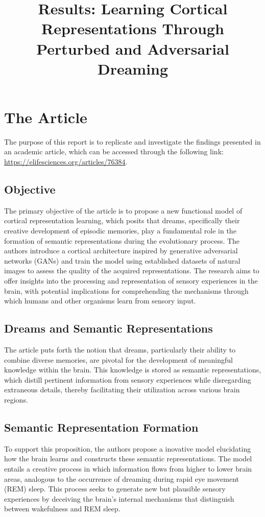\documentclass{midl} %
\title[Results: Learning Cortical Representations Through Perturbed and Adversarial Dreaming]{Results: Learning Cortical Representations Through Perturbed and Adversarial Dreaming}
\begin{document}
\maketitle


\section{The Article}
The purpose of this report is to replicate and investigate the findings presented in an academic article, which can be accessed through the following link: \url{https://elifesciences.org/articles/76384}.

\subsection{Objective}
The primary objective of the article is to propose a new functional model of cortical representation learning, which posits that dreams, specifically their creative development of episodic memories, play a fundamental role in the formation of semantic representations during the evolutionary process. The authors introduce a cortical architecture inspired by generative adversarial networks (GANs) and train the model using established datasets of natural images to assess the quality of the acquired representations. The research aims to offer insights into the processing and representation of sensory experiences in the brain, with potential implications for comprehending the mechanisms through which humans and other organisms learn from sensory input.

\subsection{Dreams and Semantic Representations}
The article puts forth the notion that dreams, particularly their ability to combine diverse memories, are pivotal for the development of meaningful knowledge within the brain. This knowledge is stored as semantic representations, which distill pertinent information from sensory experiences while disregarding extraneous details, thereby facilitating their utilization across various brain regions.

\subsection{Semantic Representation Formation}
To support this proposition, the authors propose a inovative model elucidating how the brain learns and constructs these semantic representations. The model entails a creative process in which information flows from higher to lower brain areas, analogous to the occurrence of dreaming during rapid eye movement (REM) sleep. This process seeks to generate new but plausible sensory experiences by deceiving the brain's internal mechanisms that distinguish between wakefulness and REM sleep.
\end{document}
